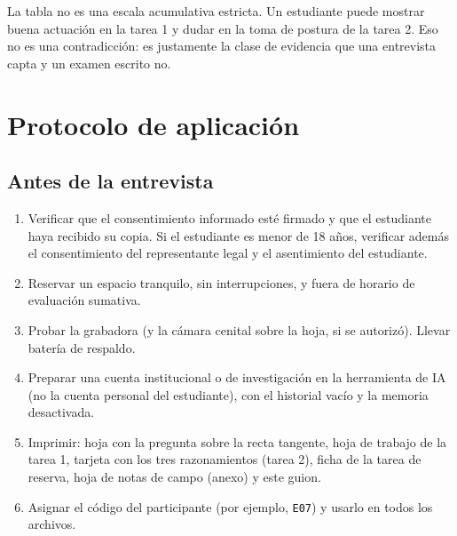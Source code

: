 \documentclass[11pt,letterpaper]{article}
\newcounter{preg}
\begin{document}
La tabla no es una escala acumulativa estricta. Un estudiante puede mostrar buena actuación en la tarea 1 y dudar en la toma de postura de la tarea 2. Eso no es una contradicción: es justamente la clase de evidencia que una entrevista capta y un examen escrito no.

\section{Protocolo de aplicación}

\subsection{Antes de la entrevista}
\begin{enumerate}
  \item Verificar que el consentimiento informado esté firmado y que el estudiante haya recibido su copia. Si el estudiante es menor de 18 años, verificar además el consentimiento del representante legal y el asentimiento del estudiante.
  \item Reservar un espacio tranquilo, sin interrupciones, y fuera de horario de evaluación sumativa.
  \item Probar la grabadora (y la cámara cenital sobre la hoja, si se autorizó). Llevar batería de respaldo.
  \item Preparar una cuenta institucional o de investigación en la herramienta de IA (no la cuenta personal del estudiante), con el historial vacío y la memoria desactivada.
  \item Imprimir: hoja con la pregunta sobre la recta tangente, hoja de trabajo de la tarea 1, tarjeta con los tres razonamientos (tarea 2), ficha de la tarea de reserva, hoja de notas de campo (anexo) y este guion.
  \item Asignar el código del participante (por ejemplo, \texttt{E07}) y usarlo en todos los archivos.
\end{enumerate}
\end{document}
